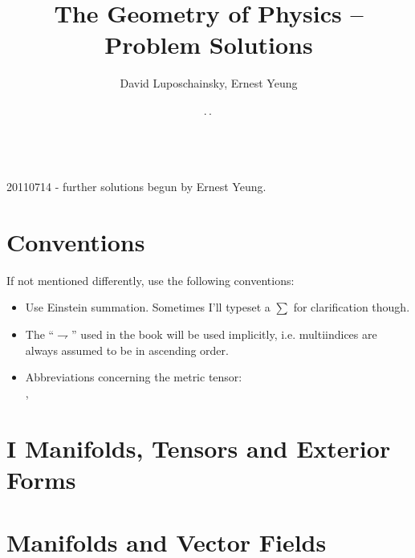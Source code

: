 






\title{The Geometry of Physics --\\Problem Solutions}
\author{David Luposchainsky, Ernest Yeung}
\date{\number\day.\,\number\month.\,\number\year}
\maketitle

 \\

20110714 - further solutions begun by Ernest Yeung.


\section*{Conventions}
If not mentioned differently, use the following conventions:
\begin{itemize}
	\item Use Einstein summation. Sometimes I'll typeset a \(\sum\) for clarification though.
	\item The ``\(\rightharpoondown\)'' used in the book will be used implicitly, i.e. multiindices are always assumed to be in ascending order.
	\item Abbreviations concerning the metric tensor: \\ , 
\end{itemize}

\newpage

\setcounter{tocdepth}{4}
\tableofcontents

\newpage

\section*{I Manifolds, Tensors and Exterior Forms}
                   
\section{Manifolds and Vector Fields}
 

